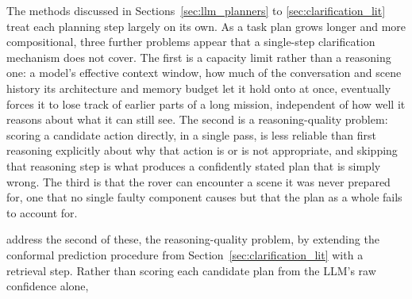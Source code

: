
The methods discussed in Sections~\ref{sec:llm_planners} to \ref{sec:clarification_lit} treat each
planning step largely on its own. As a task plan grows longer and more compositional, three
further problems appear that a single-step clarification mechanism does not cover. The first is a
capacity limit rather than a reasoning one: a model's effective context window, how much of the
conversation and scene history its architecture and memory budget let it hold onto at once,
eventually forces it to lose track of earlier parts of a long mission, independent of how well it
reasons about what it can still see. The second is a reasoning-quality problem: scoring a
candidate action directly, in a single pass, is less reliable than first reasoning explicitly
about why that action is or is not appropriate, and skipping that reasoning step is what produces
a confidently stated plan that is simply wrong. The third is that the rover can encounter a scene
it was never prepared for, one that no single faulty component causes but that the plan as a whole
fails to account for.



\citet{liang2024introspective} address the second of these, the reasoning-quality problem, by
extending the conformal prediction procedure from Section~\ref{sec:clarification_lit} with a
retrieval step. Rather than scoring each candidate plan from the LLM's raw confidence alone,


